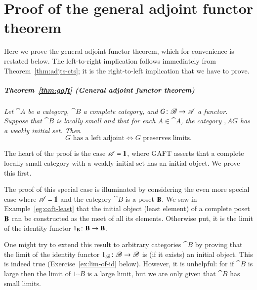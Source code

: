 %
%
%

\chapter{Proof of the general adjoint functor theorem}
%
%
%

Here we prove the general adjoint functor theorem, which for convenience is
restated below.  The left-to-right implication follows immediately from
Theorem~\ref{thm:adjts-cts}; it is the right-to-left implication that we
have to prove.

\paragraph*{\upshape Theorem~\ref{thm:gaft} (General adjoint functor theorem)}
{\itshape
Let $\cat{A}$ be a category, $\cat{B}$ a complete category, and $G\from
\cat{B} \to \cat{A}$ a functor.  Suppose that $\cat{B}$ is locally small and
that for each $A \in \cat{A}$, the category $\comma{A}{G}$ has a weakly%
%
%
%
initial set.  Then
\[
G \text{ has a left adjoint}
\iff
G \text{ preserves limits}.
\]
}

The heart of the proof is the case $\mathscr{A} = \mathbf{1}$, where GAFT asserts
that a complete locally small category with a weakly initial set has an
initial object.  We prove this first.

The proof of this special case is illuminated by considering the even more
special case where $\mathscr{A} = \mathbf{1}$ and the category $\cat{B}$ is a poset
$\mathbf{B}$.  We saw in Example~\ref{eg:oaft-least} that the initial object
(least%
%
%
element) of a complete poset $\mathbf{B}$ can be constructed as the meet of
all its elements.  Otherwise put, it is the limit of the identity functor
$1_\scat{B}\from \scat{B} \to \scat{B}$.

One might try to extend this result to arbitrary categories $\cat{B}$ by
proving that the limit of the identity%
%
%
%
%
functor $1_\cat{B}\from \cat{B} \to \cat{B}$ is (if it exists) an initial
object.  This is indeed true (Exercise~\ref{ex:lim-of-id} below).  However,
it is unhelpful: for if $\cat{B}$ is large then the limit of $1_\cat{B}$
is a large%
%
%
limit, but we are only given that $\cat{B}$ has small limits.

